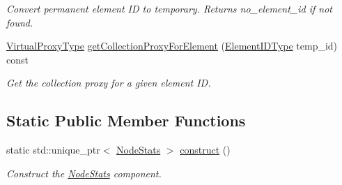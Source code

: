 \begin{DoxyCompactItemize}
\begin{DoxyCompactList}\small\item\em Convert permanent element ID to temporary. Returns {\ttfamily no\+\_\+element\+\_\+id} if not found. \end{DoxyCompactList}\item 
\hyperlink{namespacevt_a1b417dd5d684f045bb58a0ede70045ac}{Virtual\+Proxy\+Type} \hyperlink{structvt_1_1vrt_1_1collection_1_1balance_1_1_node_stats_aee43291b1cc63a189b3851f92e83040b}{get\+Collection\+Proxy\+For\+Element} (\hyperlink{namespacevt_1_1vrt_1_1collection_1_1balance_a14c8d2c972f2913aa3f1636e5be0a120}{Element\+I\+D\+Type} temp\+\_\+id) const
\begin{DoxyCompactList}\small\item\em Get the collection proxy for a given element ID. \end{DoxyCompactList}\end{DoxyCompactItemize}
\subsection*{Static Public Member Functions}
\begin{DoxyCompactItemize}
\item 
static std\+::unique\+\_\+ptr$<$ \hyperlink{structvt_1_1vrt_1_1collection_1_1balance_1_1_node_stats}{Node\+Stats} $>$ \hyperlink{structvt_1_1vrt_1_1collection_1_1balance_1_1_node_stats_a6c57b741ccef7c6d51155c3630dc380a}{construct} ()
\begin{DoxyCompactList}\small\item\em Construct the \hyperlink{structvt_1_1vrt_1_1collection_1_1balance_1_1_node_stats}{Node\+Stats} component. \end{DoxyCompactList}\end{DoxyCompactItemize}
